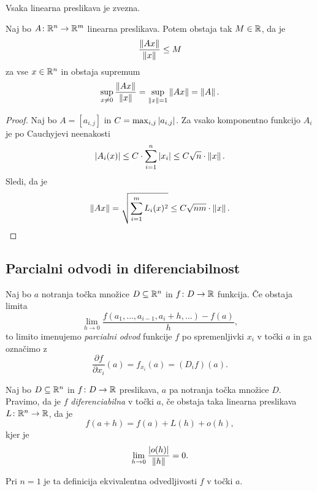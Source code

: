 \begin{posledica}
Vsaka linearna preslikava je zvezna.
\end{posledica}

\begin{trditev}\label{td:1}
Naj bo $A \colon \mathbb{R}^n \to \mathbb{R}^m$ linearna preslikava. Potem obstaja
tak $M \in \mathbb{R}$, da je
\[
\frac{\left\lVert Ax\right\rVert}{\left\lVert x\right\rVert} \leq M
\]
za vse $x \in \mathbb{R}^n$ in obstaja supremum
\[
\sup_{x \ne 0} \frac{\left\lVert Ax\right\rVert}{\left\lVert x\right\rVert} =
\sup_{\left\lVert x\right\rVert = 1}\left\lVert Ax\right\rVert =
\left\lVert A\right\rVert.
\]
\end{trditev}

\begin{proof}
Naj bo $A = [a_{i,j}]$ in $C = \max_{i,j}\left\lvert a_{i,j}\right\rvert$. Za vsako
komponentno funkcijo $A_i$ je po Cauchyjevi neenakosti
\[
\left\lvert A_i(x)\right\rvert \leq
C \cdot \sum_{i=1}^n \left\lvert x_i\right\rvert \leq
C\sqrt{n} \cdot \left\lVert x\right\rVert.
\]
Sledi, da je
\[
\left\lVert Ax\right\rVert =
\sqrt{\sum_{i=1}^m L_i(x)^2} \leq
C \sqrt{nm} \cdot \left\lVert x\right\rVert. \qedhere
\]
\end{proof}

\newpage

\subsection{Parcialni odvodi in diferenciabilnost}

\begin{definicija}
Naj bo $a$ notranja točka množice $D \subseteq \mathbb{R}^n$ in
$f \colon D \to \mathbb{R}$ funkcija. Če obstaja limita
\[
\lim_{h \to 0}
\frac{f(a_1, \dots, a_{i-1}, a_i+h, \dots) - f(a)}{h},
\]
to limito imenujemo \emph{parcialni odvod} funkcije $f$ po spremenljivki $x_i$ v točki $a$ in
ga označimo z
\[
\frac{\partial f}{\partial x_i}(a) = f_{x_i}(a) = (D_if)(a).
\]
\end{definicija}

\begin{definicija}
Naj bo $D \subseteq \mathbb{R}^n$ in $f \colon D \to \mathbb{R}$ preslikava, $a$ pa
notranja točka množice $D$. Pravimo, da je $f$
\emph{diferenciabilna} v točki
$a$, če obstaja taka linearna preslikava
$L \colon \mathbb{R}^n \to \mathbb{R}$, da je
\[
f(a+h) = f(a) + L(h) + o(h),
\]
kjer je
\[
\lim_{h \to 0}\frac{\left\lvert o(h)\right\rvert}{\left\lVert h\right\rVert} = 0.
\]
\end{definicija}

\begin{opomba}
Pri $n=1$ je ta definicija ekvivalentna odvedljivosti $f$ v točki
$a$.
\end{opomba}

